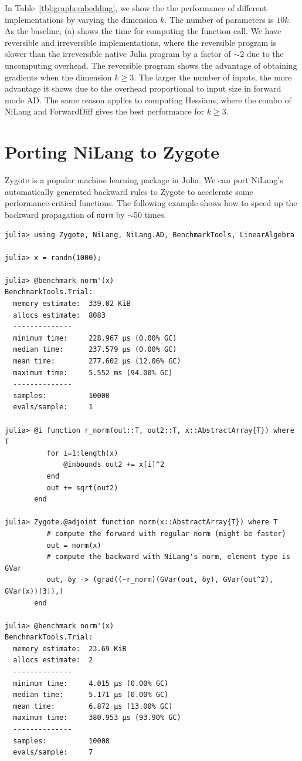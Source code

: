 \documentclass{article}
\let\oldsim\sim
\renewcommand{\sim}{{\oldsim}}
\newcommand{\<}{\langle}
\renewcommand{\>}{\rangle}
\newcommand{\Tbl}[1]{Table~\ref{#1}}
\theoremstyle{definition}\newtheorem{definition}{\textit{Definition}}
\begin{document}
In \Tbl{tbl:graphembedding}, we show the the performance of different implementations by varying the dimension $k$. The number of parameters is $10k$.
As the baseline, (a) shows the time for computing the function call. We have reversible and irreversible implementations, where the reversible program is slower than the irreversible native Julia program by a factor of $\sim2$ due to the uncomputing overhead.
The reversible program shows the advantage of obtaining gradients when the dimension $k \geq 3$. The larger the number of inputs, the more advantage it shows due to the overhead proportional to input size in forward mode AD.
The same reason applies to computing Hessians, where the combo of NiLang and ForwardDiff gives the best performance for $k \geq 3$.

\section{Porting NiLang to Zygote}\label{app:zygote}

Zygote is a popular machine learning package in Julia. We can port NiLang's automatically generated backward rules to Zygote to accelerate some performance-critical functions.
The following example shows how to speed up the backward propagation of \texttt{norm} by $\sim$50 times.

\begin{minipage}{.88\textwidth}
    \begin{lstlisting}[mathescape=true,caption={Porting NiLang to Zygote.},label={lst:zygote}, frame=tlrb]
julia> using Zygote, NiLang, NiLang.AD, BenchmarkTools, LinearAlgebra

julia> x = randn(1000);

julia> @benchmark norm'(x)
BenchmarkTools.Trial: 
  memory estimate:  339.02 KiB
  allocs estimate:  8083
  --------------
  minimum time:     228.967 μs (0.00% GC)
  median time:      237.579 μs (0.00% GC)
  mean time:        277.602 μs (12.06% GC)
  maximum time:     5.552 ms (94.00% GC)
  --------------
  samples:          10000
  evals/sample:     1

julia> @i function r_norm(out::T, out2::T, x::AbstractArray{T}) where T
          for i=1:length(x)
              @inbounds out2 += x[i]^2
          end
          out += sqrt(out2)
       end

julia> Zygote.@adjoint function norm(x::AbstractArray{T}) where T
          # compute the forward with regular norm (might be faster)
          out = norm(x)
          # compute the backward with NiLang's norm, element type is GVar
          out, δy -> (grad((~r_norm)(GVar(out, δy), GVar(out^2), GVar(x))[3]),)
       end

julia> @benchmark norm'(x)
BenchmarkTools.Trial: 
  memory estimate:  23.69 KiB
  allocs estimate:  2
  --------------
  minimum time:     4.015 μs (0.00% GC)
  median time:      5.171 μs (0.00% GC)
  mean time:        6.872 μs (13.00% GC)
  maximum time:     380.953 μs (93.90% GC)
  --------------
  samples:          10000
  evals/sample:     7
\end{lstlisting}
\end{minipage}
\end{document}
